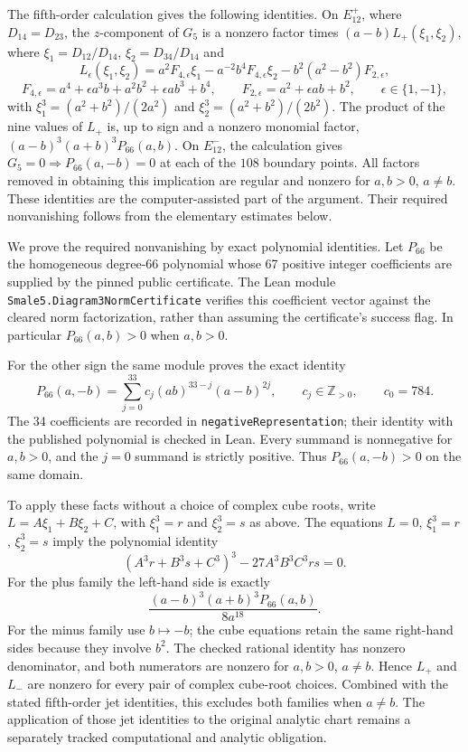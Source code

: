 \documentclass[Threeside,11pt]{article}
\theoremstyle{definition}
\theoremstyle{remark}
\numberwithin{equation}{section}
\theoremstyle{remark}
\newcommand{\code}[1]{\begingroup\def\_{\textunderscore\allowbreak}\texttt{#1}\endgroup}
\begin{document}
{The fifth-order calculation gives the following identities. On $E^+_{12}$,
where $D_{14}=D_{23}$, the $z$-component of $G_5$ is a nonzero factor times
$(a-b)L_+(\xi_1,\xi_2)$, where $\xi_1=D_{12}/D_{14}$,
$\xi_2=D_{34}/D_{14}$ and
\[
 L_\epsilon(\xi_1,\xi_2)
 =a^2F_{4,\epsilon}\xi_1-a^{-2}b^4F_{4,\epsilon}\xi_2
       -b^2(a^2-b^2)F_{2,\epsilon},
\]
\[
 F_{4,\epsilon}=a^4+\epsilon a^3b+a^2b^2+\epsilon ab^3+b^4,
 \qquad F_{2,\epsilon}=a^2+\epsilon ab+b^2,
 \qquad \epsilon\in\{1,-1\},
\]
with $\xi_1^3=(a^2+b^2)/(2a^2)$ and
$\xi_2^3=(a^2+b^2)/(2b^2)$.
The product of the nine values of $L_+$ is, up to sign and a nonzero monomial
factor, $(a-b)^3(a+b)^3P_{66}(a,b)$.
On $E^-_{12}$, the calculation gives $G_5=0\Rightarrow P_{66}(a,-b)=0$
at each of the $108$ boundary points. All factors removed in obtaining this implication
are regular and nonzero for $a,b>0$, $a\ne b$.
These identities are the computer-assisted part of the argument.
Their required nonvanishing follows from the elementary estimates below.

We prove the required nonvanishing by exact polynomial identities.
Let $P_{66}$ be the homogeneous degree-66 polynomial whose 67 positive
integer coefficients are supplied by the pinned public certificate. The Lean
module \code{Smale5.Diagram3NormCertificate} verifies this coefficient vector
against the cleared norm factorization, rather than assuming the certificate's
success flag. In particular $P_{66}(a,b)>0$ when $a,b>0$.

For the other sign the same module proves the exact identity
\[
 P_{66}(a,-b)=\sum_{j=0}^{33}c_j(ab)^{33-j}(a-b)^{2j},
 \qquad c_j\in\mathbb Z_{>0},\qquad c_0=784.
\]
The 34 coefficients are recorded in \code{negativeRepresentation}; their
identity with the published polynomial is checked in Lean. Every summand is
nonnegative for $a,b>0$, and the $j=0$ summand is strictly positive.
Thus $P_{66}(a,-b)>0$ on the same domain.

To apply these facts without a choice of complex cube roots, write
$L=A\xi_1+B\xi_2+C$, with $\xi_1^3=r$ and $\xi_2^3=s$ as above.
The equations $L=0$, $\xi_1^3=r$, $\xi_2^3=s$ imply the polynomial identity
\[
 (A^3r+B^3s+C^3)^3-27A^3B^3C^3rs=0.
\]
For the plus family the left-hand side is exactly
\[
 \frac{(a-b)^3(a+b)^3P_{66}(a,b)}{8a^{18}}.
\]
For the minus family use $b\mapsto-b$; the cube equations retain the same
right-hand sides because they involve $b^2$. The checked rational identity
has nonzero denominator, and both numerators are nonzero for $a,b>0$,
$a\ne b$. Hence $L_+$ and $L_-$ are nonzero for every pair of complex
cube-root choices. Combined with the stated fifth-order jet identities,
this excludes both families when $a\ne b$. The application of those jet
identities to the original analytic chart remains a separately tracked
computational and analytic obligation.


}
\end{document}
